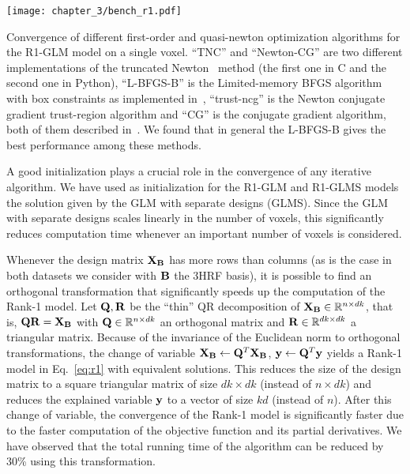 \begin{marginfigure}
\hspace{-10pt}\texttt{[image: chapter\_3/bench\_r1.pdf]}
\caption{Convergence of different first-order and quasi-newton optimization algorithms for the R1-GLM model on a single voxel. ``TNC'' and ``Newton-CG'' are two different implementations of the truncated Newton~\citep{nash1984newton} method (the first one in C and the second one in Python), ``L-BFGS-B'' is the Limited-memory BFGS algorithm with box constraints as implemented in~\citep{zhu1997algorithm}, ``trust-ncg'' is the Newton conjugate gradient trust-region 
algorithm and ``CG'' is the conjugate gradient algorithm, both of them described in~\citep{nocedal2006numerical}. We found that in general the L-BFGS-B gives the best performance among these methods.}
\end{marginfigure}


A good initialization plays a crucial role in the convergence of any iterative
algorithm. We have used as initialization for the R1-GLM and R1-GLMS models the solution given by the GLM with
separate designs (GLMS). Since the GLM with separate designs scales linearly in the number of voxels, this significantly reduces computation time whenever
an important number of voxels is considered.

Whenever the design matrix $\mathbf{X}_{\mathbf{B}}$ has more rows than columns (as is
the case in both datasets we consider with $\mathbf{B}$ the 3HRF basis), it is possible to
find an orthogonal transformation that significantly speeds up the computation
of the Rank-1 model. Let $\mathbf{Q}, \mathbf{R}$ be the ``thin'' QR decomposition of
$\mathbf{X}_{\mathbf{B}} \in {\mathbb R}^{n \times d k}$, that is, $\mathbf{Q} \mathbf{R} = \mathbf{X}_{\mathbf{B}}$ with $\mathbf{Q}
\in {\mathbb R}^{n \times d k}$ an orthogonal matrix and $\mathbf{R} \in {\mathbb R}^{d k \times d k}$ 
a triangular matrix. Because of the invariance of the Euclidean norm to orthogonal
transformations, the change of variable $\mathbf{X}_{\mathbf{B}} \leftarrow \mathbf{Q}^T
\mathbf{X}_{\mathbf{B}}$, $\mathbf{y} \leftarrow \mathbf{Q}^T \mathbf{y}$ yields a Rank-1 model in Eq.~\eqref{eq:r1}
with equivalent solutions. This reduces the size of the design matrix to a square triangular matrix of size $d k \times d k$ (instead of $n \times d k$) and reduces the explained variable $\mathbf{y}$ to a vector of size $k d$ (instead of $n$). After this change of variable, the convergence of the Rank-1 model is significantly faster due to the faster computation of the objective function and its partial derivatives.  We have observed that the total running time of the algorithm can be
reduced by 30\% using this transformation.


